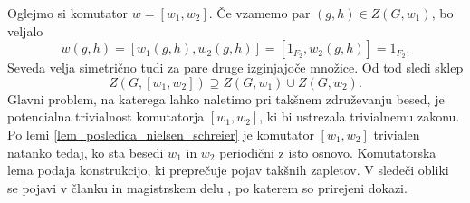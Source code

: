 Oglejmo si komutator $w = [w_1, w_2]$. Če vzamemo par $(g, h) \in Z(G, w_1)$, bo veljalo \begin{equation*}
w(g,h) = [w_1(g,h), w_2(g,h)] = [1_{F_2}, w_2(g,h)] = 1_{F_2}.
\end{equation*}  
  Seveda velja simetrično tudi za pare druge izginjajoče množice. Od tod sledi sklep \begin{equation*}
  Z(G, [w_1, w_2]) \supseteq Z(G, w_1) \cup Z(G, w_2).
  \end{equation*}  
Glavni problem, na katerega lahko naletimo pri takšnem združevanju besed, je potencialna trivialnost komutatorja $[w_1, w_2]$, ki bi ustrezala trivialnemu zakonu.
Po lemi \ref{lem_posledica_nielsen_schreier} je komutator $[w_1, w_2]$ trivialen natanko tedaj, ko sta besedi $w_1$ in $w_2$ periodični z isto osnovo. 
Komutatorska lema podaja konstrukcijo, ki preprečuje pojav takšnih zapletov. V sledeči obliki se pojavi v članku \cite{Kozma_Thom_2016} in magistrskem delu \cite{Schneider_2016}, po katerem so prirejeni dokazi.

